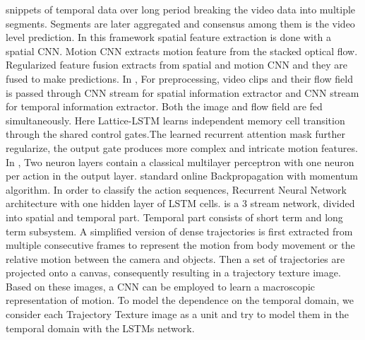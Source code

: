 \documentclass[11pt,english]{article}
\begin{document}
snippets of temporal data over long period breaking the video data into multiple segments. Segments are later aggregated and consensus among them is the video level prediction. \citep{wu2015modeling} In this framework spatial feature extraction is done with a spatial CNN. Motion CNN extracts motion feature from the stacked optical flow. Regularized feature fusion extracts from spatial and motion CNN and they are fused to make predictions. In \citep{sun2017lattice}, For preprocessing, video clips and their flow field is passed through CNN stream for spatial information extractor and CNN stream for temporal information extractor. Both the image and flow field are fed simultaneously. Here Lattice-LSTM learns independent memory cell transition through the shared control gates.The learned recurrent attention mask further regularize, the output gate produces more complex and intricate motion features. In \citep{baccouche2011sequential}, Two neuron layers contain a classical multilayer perceptron with one neuron per action in the output layer. standard online Backpropagation with momentum algorithm. In order to classify the action sequences, Recurrent Neural Network architecture with one hidden layer of LSTM cells. \citep{shi2017sequential} is a 3 stream network, divided into spatial and temporal part. Temporal part consists of short term and long term subsystem. A simplified version of dense trajectories is first extracted from multiple consecutive frames to represent the motion from body movement or the relative motion between the camera and objects. Then a set of trajectories are projected onto a canvas, consequently resulting in a trajectory texture image. Based on these images, a CNN can be employed to learn a macroscopic representation of motion. To model the dependence on the temporal domain, we consider each Trajectory Texture image as a unit and try to model them in the temporal domain with the LSTMs network.
\end{document}
